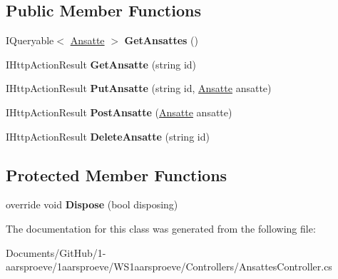 \subsection*{Public Member Functions}
\begin{DoxyCompactItemize}
\item 
\hypertarget{class_w_s1aarsproeve_1_1_controllers_1_1_ansattes_controller_abae1e97fe6c1da523b8282c16a60b004}{}I\+Queryable$<$ \hyperlink{class_w_s1aarsproeve_1_1_ansatte}{Ansatte} $>$ {\bfseries Get\+Ansattes} ()\label{class_w_s1aarsproeve_1_1_controllers_1_1_ansattes_controller_abae1e97fe6c1da523b8282c16a60b004}

\item 
\hypertarget{class_w_s1aarsproeve_1_1_controllers_1_1_ansattes_controller_a628a2903f9b4bdf4e73c4e3c5043c00f}{}I\+Http\+Action\+Result {\bfseries Get\+Ansatte} (string id)\label{class_w_s1aarsproeve_1_1_controllers_1_1_ansattes_controller_a628a2903f9b4bdf4e73c4e3c5043c00f}

\item 
\hypertarget{class_w_s1aarsproeve_1_1_controllers_1_1_ansattes_controller_a9b837cfedda7f79c523e5ce616e45837}{}I\+Http\+Action\+Result {\bfseries Put\+Ansatte} (string id, \hyperlink{class_w_s1aarsproeve_1_1_ansatte}{Ansatte} ansatte)\label{class_w_s1aarsproeve_1_1_controllers_1_1_ansattes_controller_a9b837cfedda7f79c523e5ce616e45837}

\item 
\hypertarget{class_w_s1aarsproeve_1_1_controllers_1_1_ansattes_controller_a64f55e5fa5fd3fd59b144eaee2bf1c00}{}I\+Http\+Action\+Result {\bfseries Post\+Ansatte} (\hyperlink{class_w_s1aarsproeve_1_1_ansatte}{Ansatte} ansatte)\label{class_w_s1aarsproeve_1_1_controllers_1_1_ansattes_controller_a64f55e5fa5fd3fd59b144eaee2bf1c00}

\item 
\hypertarget{class_w_s1aarsproeve_1_1_controllers_1_1_ansattes_controller_a64d601bd2f4d4d96728837179ed75a07}{}I\+Http\+Action\+Result {\bfseries Delete\+Ansatte} (string id)\label{class_w_s1aarsproeve_1_1_controllers_1_1_ansattes_controller_a64d601bd2f4d4d96728837179ed75a07}

\end{DoxyCompactItemize}
\subsection*{Protected Member Functions}
\begin{DoxyCompactItemize}
\item 
\hypertarget{class_w_s1aarsproeve_1_1_controllers_1_1_ansattes_controller_ad344ea6d5bca0dfbdc80e5cf1f06b2cc}{}override void {\bfseries Dispose} (bool disposing)\label{class_w_s1aarsproeve_1_1_controllers_1_1_ansattes_controller_ad344ea6d5bca0dfbdc80e5cf1f06b2cc}

\end{DoxyCompactItemize}


The documentation for this class was generated from the following file\+:\begin{DoxyCompactItemize}
\item 
Documents/\+Git\+Hub/1-\/aarsproeve/1aarsproeve/\+W\+S1aarsproeve/\+Controllers/Ansattes\+Controller.\+cs\end{DoxyCompactItemize}

